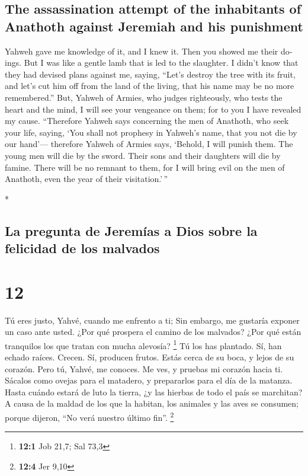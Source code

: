 \begin{paracol}{2}
\begin{otherlanguage}{english}
\hypertarget{the-assassination-attempt-of-the-inhabitants-of-anathoth-against-jeremiah-and-his-punishment}{%
\subsection{The assassination attempt of the inhabitants of Anathoth
against Jeremiah and his
punishment}\label{the-assassination-attempt-of-the-inhabitants-of-anathoth-against-jeremiah-and-his-punishment}}

 Yahweh gave me knowledge of it, and I knew it. Then you
showed me their doings.  But I was like a gentle lamb
that is led to the slaughter. I didn't know that they had devised plans
against me, saying, ``Let's destroy the tree with its fruit, and let's
cut him off from the land of the living, that his name may be no more
remembered.''  But, Yahweh of Armies, who judges
righteously, who tests the heart and the mind, I will see your vengeance
on them; for to you I have revealed my cause. 
``Therefore Yahweh says concerning the men of Anathoth, who seek your
life, saying, `You shall not prophesy in Yahweh's name, that you not die
by our hand'---  therefore Yahweh of Armies says,
`Behold, I will punish them. The young men will die by the sword. Their
sons and their daughters will die by famine.  There will
be no remnant to them, for I will bring evil on the men of Anathoth,
even the year of their visitation.'\,''

\end{otherlanguage}

\switchcolumn[0]*

\hypertarget{la-pregunta-de-jeremuxedas-a-dios-sobre-la-felicidad-de-los-malvados}{%
\subsection{La pregunta de Jeremías a Dios sobre la felicidad de los
malvados}\label{la-pregunta-de-jeremuxedas-a-dios-sobre-la-felicidad-de-los-malvados}}

\hypertarget{section-22}{%
\section{12}\label{section-22}}

 Tú eres justo, Yahvé, cuando me enfrento a ti; Sin
embargo, me gustaría exponer un caso ante usted. ¿Por qué prospera el
camino de los malvados? ¿Por qué están tranquilos los que tratan con
mucha alevosía? \footnote{\textbf{12:1} Job 21,7; Sal 73,3}
 Tú los has plantado. Sí, han echado raíces. Crecen. Sí,
producen frutos. Estás cerca de su boca, y lejos de su corazón.
 Pero tú, Yahvé, me conoces. Me ves, y pruebas mi corazón
hacia ti. Sácalos como ovejas para el matadero, y prepararlos para el
día de la matanza.  Hasta cuándo estará de luto la tierra,
¿y las hierbas de todo el país se marchitan? A causa de la maldad de los
que la habitan, los animales y las aves se consumen; porque dijeron,
``No verá nuestro último fin''. \footnote{\textbf{12:4} Jer 9,10}


\end{paracol}
